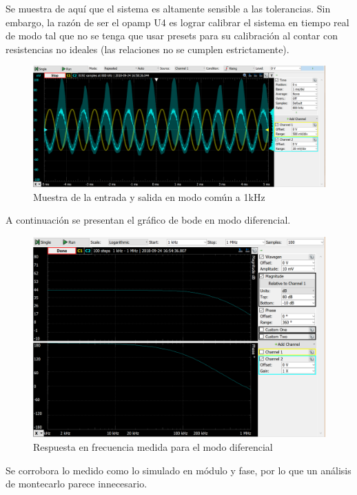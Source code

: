 \documentclass[../../tc_tp3_main.tex]{subfiles}
\begin{document}
	Se muestra de aquí que el sistema es altamente sensible a las tolerancias. Sin embargo, la razón de ser el opamp U4 es lograr calibrar el sistema en tiempo real de modo tal que no se tenga que usar presets para su calibración al contar con resistencias no ideales (las relaciones no se cumplen estrictamente).
			\begin{figure}[h!]	
		\centering
		\includegraphics[scale=0.6]{imagenes/ganancia_comun_medido.png}
		\caption{Muestra de la entrada y salida en modo común a 1kHz}
		\label{fig:ej3_ganancia_comun_medido}
	\end{figure}
	
	A continuación se presentan el gráfico de bode en modo diferencial.
	
	\begin{figure}[h!]	
		\centering
		\includegraphics[scale=0.6]{imagenes/bode_diferencial_medido.png}
		\caption{Respuesta en frecuencia medida para el modo diferencial}
		\label{fig:ej3_bode_diferencial_medido}
	\end{figure}
	Se corrobora lo medido como lo simulado en módulo y fase, por lo que un análisis de montecarlo parece innecesario.
	
\end{document}
